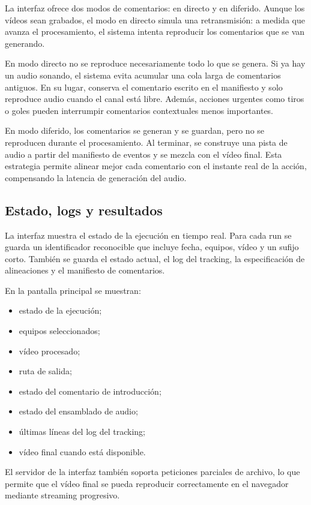 La interfaz ofrece dos modos de comentarios: en directo y en diferido. Aunque los vídeos sean grabados, el modo en directo simula una retransmisión: a medida que avanza el procesamiento, el sistema intenta reproducir los comentarios que se van generando.

En modo directo no se reproduce necesariamente todo lo que se genera. Si ya hay un audio sonando, el sistema evita acumular una cola larga de comentarios antiguos. En su lugar, conserva el comentario escrito en el manifiesto y solo reproduce audio cuando el canal está libre. Además, acciones urgentes como tiros o goles pueden interrumpir comentarios contextuales menos importantes.

En modo diferido, los comentarios se generan y se guardan, pero no se reproducen durante el procesamiento. Al terminar, se construye una pista de audio a partir del manifiesto de eventos y se mezcla con el vídeo final. Esta estrategia permite alinear mejor cada comentario con el instante real de la acción, compensando la latencia de generación del audio.

\subsection{Estado, logs y resultados}

La interfaz muestra el estado de la ejecución en tiempo real. Para cada run se guarda un identificador reconocible que incluye fecha, equipos, vídeo y un sufijo corto. También se guarda el estado actual, el log del tracking, la especificación de alineaciones y el manifiesto de comentarios.

En la pantalla principal se muestran:

\begin{itemize}
    \item estado de la ejecución;
    \item equipos seleccionados;
    \item vídeo procesado;
    \item ruta de salida;
    \item estado del comentario de introducción;
    \item estado del ensamblado de audio;
    \item últimas líneas del log del tracking;
    \item vídeo final cuando está disponible.
\end{itemize}

El servidor de la interfaz también soporta peticiones parciales de archivo, lo que permite que el vídeo final se pueda reproducir correctamente en el navegador mediante streaming progresivo.

